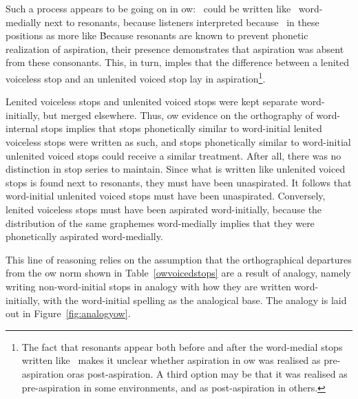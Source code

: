 Such a process appears to be going on in \gls{ow}: \lT\  could be written like \xD\ word-medially next to resonants, because listeners interpreted  because \lT\ in these positions as more like \xD\. Because resonants are known to prevent phonetic realization of aspiration, their presence demonstrates that  aspiration was absent from these consonants. This, in turn, imples that the difference between a lenited voiceless stop and an unlenited voiced stop lay in aspiration\footnote{The fact that resonants appear both before and after the word-medial stops written like \xD\ makes it unclear whether  aspiration in \gls{ow} was realised as pre-aspiration oras  post-aspiration. A third option may be that it was realised as pre-aspiration in some environments, and as post-aspiration in others.}.

Lenited voiceless stops and unlenited voiced stops were kept separate word-initially, but merged elsewhere. Thus, \gls{ow} evidence on the orthography of word-internal stops implies that stops phonetically similar to word-initial lenited voiceless stops were written as such, and stops phonetically similar to word-initial unlenited voiced stops could receive a similar treatment. After all, there was no distinction in stop series to maintain. Since what is written like unlenited voiced stops is found next to resonants, they must have been unaspirated. It follows that word-initial unlenited voiced stops must have been unaspirated. Conversely, lenited voiceless stops must have been aspirated  word-initially, because the distribution of the same graphemes word-medially implies that they were phonetically aspirated word-medially.

This line of reasoning relies on the assumption that the orthographical departures from the \gls{ow} norm shown in Table~\ref{owvoicedstops} are a result of analogy, namely writing non-word-initial stops in analogy with how they are written word-initially, with the word-initial spelling as the analogical base. The analogy is laid out in Figure~\ref{fig:analogyow}.

